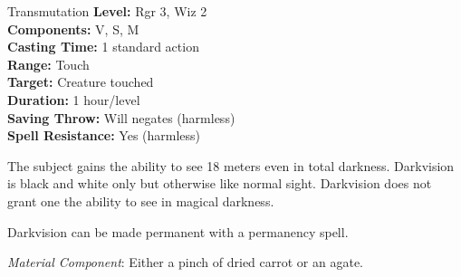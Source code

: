 {Transmutation}
{
	\textbf{Level:}
	Rgr 3, Wiz 2\\
	\textbf{Components:}
	V, S, M\\
	\textbf{Casting Time:}
	1 standard action\\
	\textbf{Range:}
	Touch\\
	\textbf{Target:}
	Creature touched\\
	\textbf{Duration:}
	1 hour/level\\
	\textbf{Saving Throw:}
	Will negates (harmless)\\
	\textbf{Spell Resistance:}
	Yes (harmless)\\
}
{
	The subject gains the ability to see 18 meters even in total darkness. Darkvision is black and white only but otherwise like normal sight. Darkvision does not grant one the ability to see in magical darkness.

	Darkvision can be made permanent with a permanency spell.

	\textit{Material Component}:
	Either a pinch of dried carrot or an agate.

}
